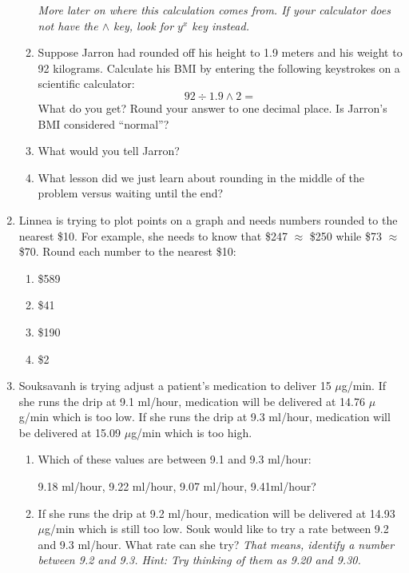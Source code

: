 \begin{enumerate}
\begin{enumerate}
\emph{More later on where this calculation comes from.  If your calculator does not have the $\wedge$ key, look for $y^x$ key instead.}
\vfill
\item Suppose Jarron had rounded off his height to 1.9 meters and his weight to 92 kilograms.  Calculate his BMI by entering the following keystrokes on a scientific calculator:  $$92 \div 1.9 \wedge 2=$$
What do you get?  Round your answer to one decimal place.  Is Jarron's BMI considered ``normal''?
\vfill
\item What would you tell Jarron?
\vfill
\item What lesson did we just learn about rounding in the middle of the problem versus waiting until the end? \vfill
\end{enumerate}

\item Linnea is trying to plot points on a graph and needs numbers rounded to the nearest \$10. For example, she needs to know that \$247 $\approx$ \$250 while \$73 $\approx$ \$70.  Round each number to the nearest \$10:
\begin{multicols}{4}
\begin{enumerate}
\item \$589
\item \$41
\item \$190
\item \$2
\end{enumerate}
\end{multicols}

\item Souksavanh is trying adjust a patient's medication to deliver 15 $\mu$g/min.  If she runs the drip at 9.1 ml/hour, medication will be delivered at 14.76 $\mu$g/min which is too low.  If she runs the drip at 9.3 ml/hour, medication will be delivered at 15.09 $\mu$g/min which is too high.

\begin{enumerate}
\item Which of these values are between 9.1 and 9.3 ml/hour:  
\begin{center}
9.18 ml/hour, 9.22 ml/hour, 9.07 ml/hour, 9.41ml/hour?
\end{center}
\item If she runs the drip at 9.2 ml/hour, medication will be delivered at 14.93 $\mu$g/min which is still too low.  Souk would like to try a rate between 9.2 and 9.3 ml/hour.  What rate can she try?  \emph{That means, identify a number between 9.2 and 9.3.  Hint:  Try thinking of them as 9.20 and 9.30.}


\end{enumerate}
\end{enumerate}

